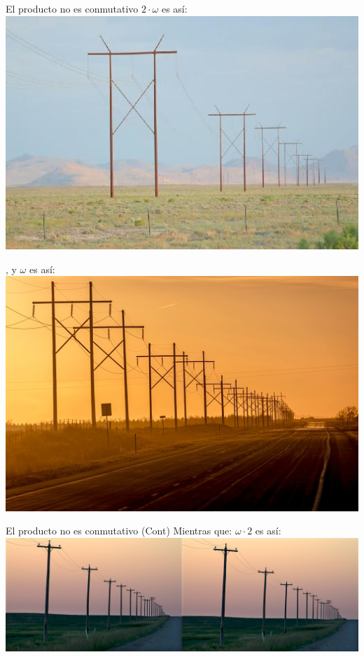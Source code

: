 \documentclass[10pt,spanish]{beamer}
\begin{document}
\begin{frame}{El producto no es conmutativo}
\pause
$2\cdot \omega$ es así:
\includegraphics[scale=0.42]{2w_n.jpg}


, y $\omega$ es así:
\includegraphics[scale=0.42]{w_n.png}

\end{frame}

\begin{frame}{El producto no es conmutativo (Cont)}
	Mientras que: $\omega \cdot 2$ es así:
	\includegraphics[scale=0.42]{w2.png}
\end{frame}
\end{document}
